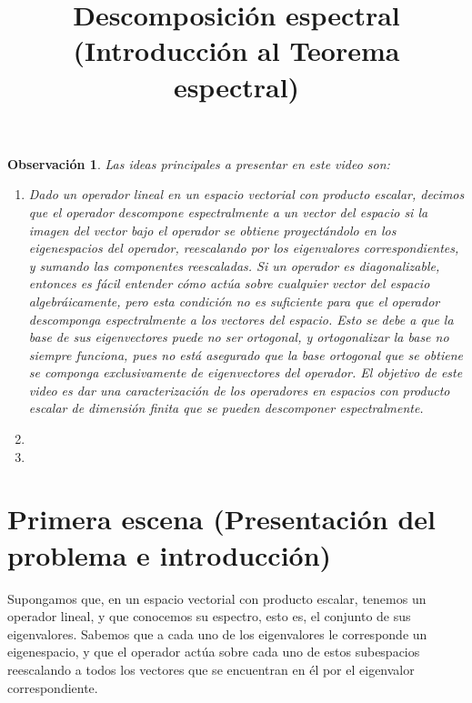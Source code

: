\documentclass[12pt,dvipsnames]{article}
\newtheorem{obs}{Observación}[section]
\numberwithin{equation}{section}
\begin{document}
\title{Descomposición espectral \\ (Introducción al Teorema espectral)}
\date{}
\maketitle

\begin{obs}
    Las ideas principales a presentar en este video son:

    \begin{enumerate}[label=(\roman*)]
        \item Dado un operador lineal en un espacio vectorial con producto escalar, decimos que el operador descompone espectralmente a un vector del espacio si la imagen del vector bajo el operador se obtiene proyectándolo en los eigenespacios del operador, reescalando por los eigenvalores correspondientes, y sumando las componentes reescaladas. Si un operador es diagonalizable, entonces es fácil entender cómo actúa sobre cualquier vector del espacio algebráicamente, pero esta condición no es suficiente para que el operador descomponga espectralmente a los vectores del espacio. Esto se debe a que la base de sus eigenvectores puede no ser ortogonal, y ortogonalizar la base no siempre funciona, pues no está asegurado que la base ortogonal que se obtiene se componga exclusivamente de eigenvectores del operador. El objetivo de este video es dar una caracterización de los operadores en espacios con producto escalar de dimensión finita que se pueden descomponer espectralmente.

        \item 

        \item 
    \end{enumerate}
\end{obs}


\newpage
\section{Primera escena (Presentación del problema e introducción)}

Supongamos que, en un espacio vectorial con producto escalar, tenemos un operador lineal, y que conocemos su espectro, esto es, el conjunto de sus eigenvalores. Sabemos que a cada uno de los eigenvalores le corresponde un eigenespacio, y que el operador actúa sobre cada uno de estos subespacios reescalando a todos los vectores que se encuentran en él por el eigenvalor correspondiente.
\end{document}
